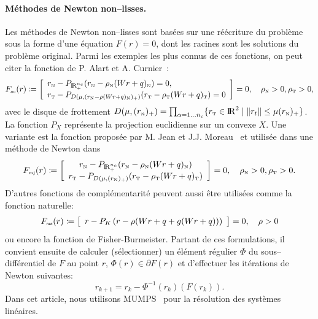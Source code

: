 \documentclass{CSMA2017}
\def\RR{\nbR}
\def\nbR{\ensuremath{\mathrm{I\!R}}} %
\def\n{{\hbox{\tiny{N}}}}
\def\t{{\hbox{\tiny{T}}}}
\def\nat{{\hbox{\sf \tiny{nat}}}}
\def\ac{{\hbox{\tiny{ac}}}}
\def\mjtwo{{\hbox{\tiny{mj}}}}
\begin{document}
\paragraph{Méthodes de Newton non--lisses.} 
Les méthodes  de Newton non--lisses sont basées sur une réécriture du problème sous la forme d'une équation $F(r)=0$, dont les racines sont les solutions du problème original. Parmi les exemples les plus connus de ces fonctions, on peut citer la fonction de P. Alart et A. Curnier~\cite{Alart.Curnier1991}:
\begin{equation}
  \label{eq:AC-1}
 F_\ac(r) \coloneqq  
  \left[
  \begin{array}{l} 
    r_\n - P_{\RR^{n_c}_+}(r_\n - \rho_\n  (Wr+q)_\n) = 0, \\
    r_\t - P_{D(\mu, (r_\n - \rho (Wr+q)_\n)_+)}(r_\t - \rho_\t (Wr+q)_\t   )=0
  \end{array}
  \right] =0,\quad \rho_\n>0, \rho_\t>0,
\end{equation}
avec le disque de frottement  $D(\mu,(r_{n})_+) = \prod_{\alpha=1\ldots n_c} \{ r_\t \in \RR^2 \mid  \|r_t\| \leq \mu (r_\n)_+  \}$. La fonction $P_X$ représente la projection euclidienne sur un convexe $X$. Une variante  est la fonction proposée par M. Jean et J.J. Moreau~\cite{Jean.Moreau1987} et utilisée dans une méthode de Newton dans~\cite{Christensen.Klarbring.ea1998}
\begin{equation}
  \label{eq:MJ-II}
    F_{\mjtwo}(r) \coloneqq \left[ \begin{array}{c}
    r_\n - P_{\RR^{n_c}_+}(r_\n - \rho_\n (W r +  q)_\n) \\
    r_\t - P_{D(\mu, (r_{\n})_+)}(r_\t - \rho_\t (Wr+q)_\t   ) 
  \end{array}\right] =0,\quad \rho_\n>0, \rho_\t>0.
\end{equation}
 D'autres fonctions de complémentarité peuvent aussi être utilisées comme la fonction naturelle:
\begin{equation}
  \label{eq:natural-II}
  F_\nat(r) \coloneqq   \left[
  \begin{array}{l} 
    r - P_{K}\left(r  - \rho (Wr+q + g(Wr+q))\right)
  \end{array}\right] 
  = 0, \quad \rho >0
\end{equation}
ou encore la fonction de Fisher-Burmeister. Partant de ces formulations, il convient ensuite de calculer (sélectionner) un élément régulier $\Phi$ du sous--différentiel de $F$ au point $r$, $\Phi(r) \in \partial F(r)$ et d'effectuer les itérations de Newton suivantes:
\begin{equation}
  \label{eq:NSN3}
  r_{k+1}  =  r_k -  \Phi^{-1}(r_k) (F(r_k)).
\end{equation}
Dans cet article, nous utilisons MUMPS~\cite{Amestoy.ea_PC2006,Amestoy.ea_SIAMMAA2001} pour la résolution des systèmes linéaires.
\end{document}
